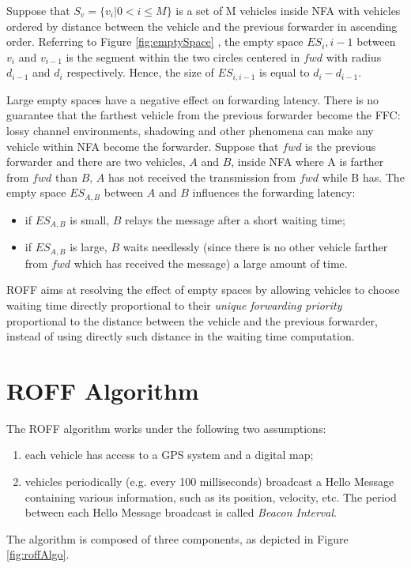 			Suppose that $S_v = \{v_i | 0 < i \leq M\}$ is a set of M vehicles inside NFA with vehicles ordered by distance between the vehicle and the previous forwarder in ascending order. Referring to Figure \ref{fig:emptySpace} , the empty space $ES_i,i-1$ between $v_i$ and $v_{i-1}$ is the segment within the two circles centered in $fwd$ with radius $d_{i-1}$ and $d_i$ respectively. Hence, the size of $ES_{i,i-1}$ is equal to $d_i - d_{i-1}$.
			
			
			Large empty spaces have a negative effect on forwarding latency. There is no guarantee that the farthest vehicle from the previous forwarder become the FFC: lossy channel environments, shadowing and other phenomena can make any vehicle within NFA become the forwarder. Suppose that $fwd$ is the previous forwarder and there are two vehicles, $A$ and $B$, inside NFA where A is farther from $fwd$ than $B$, $A$ has not received the transmission from $fwd$ while B has. The empty space $ES_{A,B}$ between $A$ and $B$ influences the forwarding latency:
			\begin{itemize}
				\item if  $ES_{A,B}$ is small, $B$ relays the message after a short waiting time;
				\item if $ES_{A,B}$ is large, $B$ waits needlessly (since there is no other vehicle farther from $fwd$ which has received the message) a large amount of time.
			\end{itemize}
			ROFF aims at resolving the effect of empty spaces by allowing vehicles to choose waiting time directly proportional to their \textit{unique forwarding priority} proportional to the distance between the vehicle and the previous forwarder, instead of using directly such distance in the waiting time computation.
		
	\section{ROFF Algorithm}
		The ROFF algorithm works under the following two assumptions:
		\begin{enumerate}
			\item each vehicle has access to a GPS system and a digital map;
			\item vehicles periodically (e.g. every 100 milliseconds) broadcast a Hello Message containing various information, such as its position, velocity, etc. The period between each Hello Message broadcast is called \textit{Beacon Interval}.
		\end{enumerate}
		The algorithm is composed of three components, as depicted in Figure \ref{fig:roffAlgo}.
	
